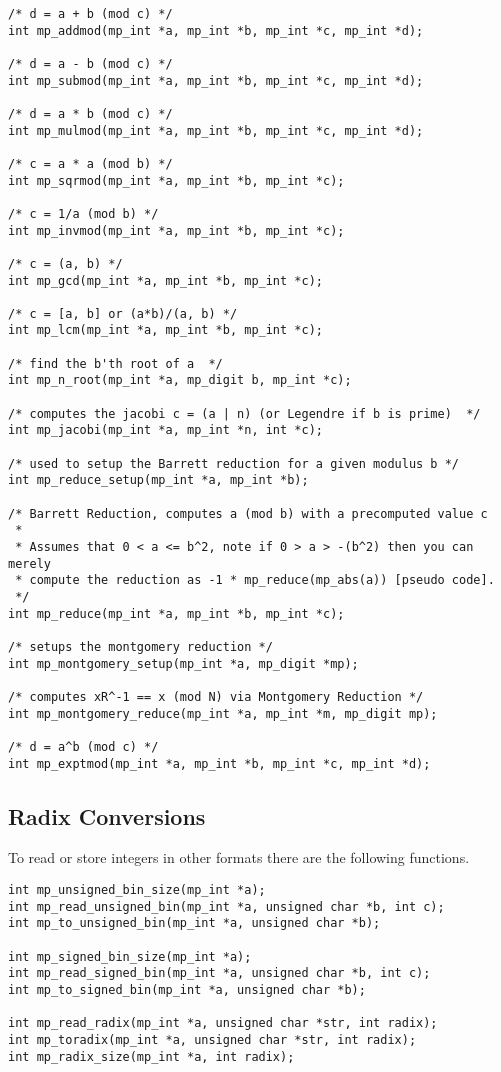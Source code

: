 \documentclass{article}
\begin{document}
\begin{verbatim}
/* d = a + b (mod c) */
int mp_addmod(mp_int *a, mp_int *b, mp_int *c, mp_int *d);

/* d = a - b (mod c) */
int mp_submod(mp_int *a, mp_int *b, mp_int *c, mp_int *d);

/* d = a * b (mod c) */
int mp_mulmod(mp_int *a, mp_int *b, mp_int *c, mp_int *d);

/* c = a * a (mod b) */
int mp_sqrmod(mp_int *a, mp_int *b, mp_int *c);

/* c = 1/a (mod b) */
int mp_invmod(mp_int *a, mp_int *b, mp_int *c);

/* c = (a, b) */
int mp_gcd(mp_int *a, mp_int *b, mp_int *c);

/* c = [a, b] or (a*b)/(a, b) */
int mp_lcm(mp_int *a, mp_int *b, mp_int *c);

/* find the b'th root of a  */
int mp_n_root(mp_int *a, mp_digit b, mp_int *c);

/* computes the jacobi c = (a | n) (or Legendre if b is prime)  */
int mp_jacobi(mp_int *a, mp_int *n, int *c);

/* used to setup the Barrett reduction for a given modulus b */
int mp_reduce_setup(mp_int *a, mp_int *b);

/* Barrett Reduction, computes a (mod b) with a precomputed value c  
 *
 * Assumes that 0 < a <= b^2, note if 0 > a > -(b^2) then you can merely
 * compute the reduction as -1 * mp_reduce(mp_abs(a)) [pseudo code].
 */
int mp_reduce(mp_int *a, mp_int *b, mp_int *c);

/* setups the montgomery reduction */
int mp_montgomery_setup(mp_int *a, mp_digit *mp);

/* computes xR^-1 == x (mod N) via Montgomery Reduction */
int mp_montgomery_reduce(mp_int *a, mp_int *m, mp_digit mp);

/* d = a^b (mod c) */
int mp_exptmod(mp_int *a, mp_int *b, mp_int *c, mp_int *d);
\end{verbatim}

\subsection{Radix Conversions}
To read or store integers in other formats there are the following functions.

\begin{verbatim}
int mp_unsigned_bin_size(mp_int *a);
int mp_read_unsigned_bin(mp_int *a, unsigned char *b, int c);
int mp_to_unsigned_bin(mp_int *a, unsigned char *b);

int mp_signed_bin_size(mp_int *a);
int mp_read_signed_bin(mp_int *a, unsigned char *b, int c);
int mp_to_signed_bin(mp_int *a, unsigned char *b);

int mp_read_radix(mp_int *a, unsigned char *str, int radix);
int mp_toradix(mp_int *a, unsigned char *str, int radix);
int mp_radix_size(mp_int *a, int radix);
\end{verbatim}
\end{document}
